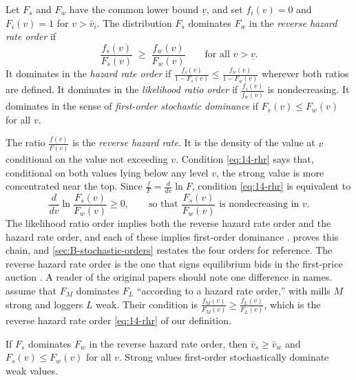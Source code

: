 \begin{definition}\label{def:14-rhr}
Let $F_s$ and $F_w$ have the common lower bound $\underline v$, and set $f_i(v)=0$ and $F_i(v)=1$
for $v>\bar v_i$. The distribution $F_s$ dominates $F_w$ in the \emph{reverse hazard rate order} if
\begin{equation}\label{eq:14-rhr}
\frac{f_s(v)}{F_s(v)}\;\ge\;\frac{f_w(v)}{F_w(v)}\qquad\text{for all } v>\underline v .
\end{equation}
It dominates in the \emph{hazard rate order} if $\frac{f_s(v)}{1-F_s(v)}\le\frac{f_w(v)}{1-F_w(v)}$
wherever both ratios are defined. It dominates in the \emph{likelihood ratio order} if
$\frac{f_s(v)}{f_w(v)}$ is nondecreasing. It dominates in the sense of \emph{first-order stochastic
dominance} if $F_s(v)\le F_w(v)$ for all $v$.
\end{definition}

The ratio $\frac{f(v)}{F(v)}$ is the \emph{reverse hazard rate}. It is the density of the value at
$v$ conditional on the value not exceeding $v$. Condition \eqref{eq:14-rhr} says that, conditional on
both values lying below any level $v$, the strong value is more concentrated near the top. Since
$\frac{f}{F}=\frac{d}{dv}\ln F$, condition \eqref{eq:14-rhr} is equivalent to
\begin{equation}\label{eq:14-rhr-ratio}
\frac{d}{dv}\ln\frac{F_s(v)}{F_w(v)}\ge 0,\qquad\text{so that } \frac{F_s(v)}{F_w(v)}\text{ is nondecreasing in } v .
\end{equation}
The likelihood ratio order implies both the reverse hazard rate order and the hazard rate order, and
each of these implies first-order dominance \citep[see][]{Krishna2010}. 
proves this chain, and \cref{sec:B-stochastic-orders} restates the four orders for reference. The reverse hazard rate
order is the one that signs equilibrium bids in the first-price auction
\citep{MaskinRiley2000,AtheyLevinSeira2011}. A reader of the original papers should note one difference in
names. \citet[Section~II.A, p.~212]{AtheyLevinSeira2011} assume that $F_M$ dominates $F_L$ ``according to a
hazard rate order,'' with mills $M$ strong and loggers $L$ weak. Their condition is
$\frac{f_M(v)}{F_M(v)}\ge\frac{f_L(v)}{F_L(v)}$, which is the reverse hazard rate order \eqref{eq:14-rhr} of
our definition.

\begin{lemma}\label{lem:14-rhr-fosd}
If $F_s$ dominates $F_w$ in the reverse hazard rate order, then $\bar v_s\ge\bar v_w$ and
$F_s(v)\le F_w(v)$ for all $v$. Strong values first-order stochastically dominate weak values.
\end{lemma}

